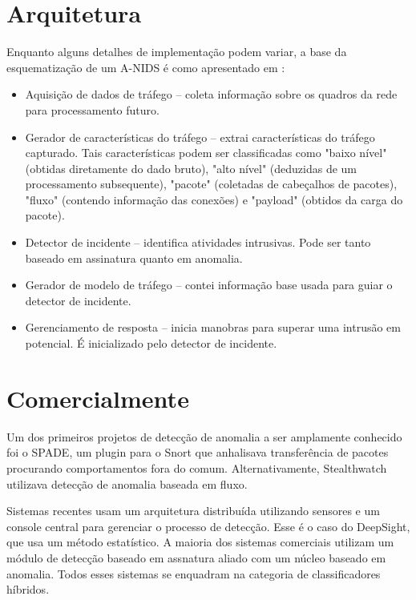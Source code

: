  \section{Arquitetura}
    Enquanto alguns detalhes de implementação podem variar, a base da esquematização de um A-NIDS é como apresentado em
    \cite{catania12}:
    \begin{itemize}
        \item Aquisição de dados de tráfego -- coleta informação sobre os quadros da rede para processamento futuro.
        \item Gerador de características do tráfego -- extrai características do tráfego capturado. Tais características
         podem ser classificadas como "baixo nível" (obtidas diretamente do dado bruto), "alto nível" (deduzidas de um
         processamento subsequente), "pacote" (coletadas de cabeçalhos de pacotes), "fluxo" (contendo informação das
         conexões) e "payload" (obtidos da carga do pacote).
        \item Detector de incidente -- identifica atividades intrusivas. Pode ser tanto baseado em assinatura quanto em
        anomalia.
        \item Gerador de modelo de tráfego -- contei informação base usada para guiar o detector de incidente.
        \item Gerenciamento de resposta -- inicia manobras para superar uma intrusão em potencial. É inicializado pelo
        detector de incidente.
    \end{itemize}

 \section{Comercialmente}
 Um dos primeiros projetos de detecção de anomalia a ser amplamente conhecido foi o SPADE, um plugin para o Snort que
 anhalisava transferência de pacotes procurando comportamentos fora do comum. Alternativamente, Stealthwatch utilizava
 detecção de anomalia baseada em fluxo.
 \par Sistemas recentes usam um arquitetura distribuída utilizando sensores e um
 console central para gerenciar o processo de detecção. Esse é o caso do DeepSight, que usa um método estatístico.
 A maioria dos sistemas comerciais utilizam um módulo de detecção baseado em assnatura aliado com um núcleo baseado em
 anomalia. Todos esses sistemas se enquadram na categoria de classificadores híbridos.